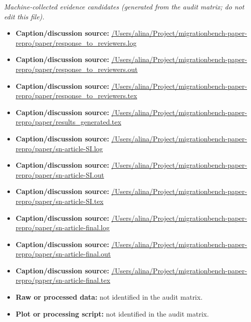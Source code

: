 \emph{Machine-collected evidence candidates (generated from the audit matrix; do not edit this file).}
\begin{itemize}[leftmargin=1.4em,noitemsep]
\item \textbf{Caption/discussion source:} \url{/Users/alina/Project/migrationbench-paper-repro/paper/response_to_reviewers.log}
\item \textbf{Caption/discussion source:} \url{/Users/alina/Project/migrationbench-paper-repro/paper/response_to_reviewers.out}
\item \textbf{Caption/discussion source:} \url{/Users/alina/Project/migrationbench-paper-repro/paper/response_to_reviewers.tex}
\item \textbf{Caption/discussion source:} \url{/Users/alina/Project/migrationbench-paper-repro/paper/results_generated.tex}
\item \textbf{Caption/discussion source:} \url{/Users/alina/Project/migrationbench-paper-repro/paper/sn-article-SI.log}
\item \textbf{Caption/discussion source:} \url{/Users/alina/Project/migrationbench-paper-repro/paper/sn-article-SI.out}
\item \textbf{Caption/discussion source:} \url{/Users/alina/Project/migrationbench-paper-repro/paper/sn-article-SI.tex}
\item \textbf{Caption/discussion source:} \url{/Users/alina/Project/migrationbench-paper-repro/paper/sn-article-final.log}
\item \textbf{Caption/discussion source:} \url{/Users/alina/Project/migrationbench-paper-repro/paper/sn-article-final.out}
\item \textbf{Caption/discussion source:} \url{/Users/alina/Project/migrationbench-paper-repro/paper/sn-article-final.tex}
\item \textbf{Raw or processed data:} not identified in the audit matrix.
\item \textbf{Plot or processing script:} not identified in the audit matrix.
\end{itemize}
